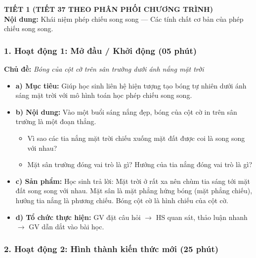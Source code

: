 \documentclass[12pt, a4paper]{article}
\begin{document}
{\large \textbf{TIẾT 1 (TIẾT 37 THEO PHÂN PHỐI CHƯƠNG TRÌNH)}}\\[0.3em]
\textbf{Nội dung:} Khái niệm phép chiếu song song --- Các tính chất cơ bản của phép chiếu song song.

\subsubsection*{1. Hoạt động 1: Mở đầu / Khởi động (05 phút)}
\textbf{Chủ đề:} \textit{Bóng của cột cờ trên sân trường dưới ánh nắng mặt trời}
\begin{itemize}
    \item \textbf{a) Mục tiêu:} Giúp học sinh liên hệ hiện tượng tạo bóng tự nhiên dưới ánh sáng mặt trời với mô hình toán học phép chiếu song song.
    \item \textbf{b) Nội dung:} Vào một buổi sáng nắng đẹp, bóng của cột cờ in trên sân trường là một đoạn thẳng.
    \begin{itemize}
        \item Vì sao các tia nắng mặt trời chiếu xuống mặt đất được coi là song song với nhau?
        \item Mặt sân trường đóng vai trò là gì? Hướng của tia nắng đóng vai trò là gì?
    \end{itemize}
    \item \textbf{c) Sản phẩm:} Học sinh trả lời: Mặt trời ở rất xa nên chùm tia sáng tới mặt đất song song với nhau. Mặt sân là mặt phẳng hứng bóng (mặt phẳng chiếu), hướng tia nắng là phương chiếu. Bóng cột cờ là hình chiếu của cột cờ.
    \item \textbf{d) Tổ chức thực hiện:} GV đặt câu hỏi $\to$ HS quan sát, thảo luận nhanh $\to$ GV dẫn dắt vào bài học.
\end{itemize}

\subsubsection*{2. Hoạt động 2: Hình thành kiến thức mới (25 phút)}
\end{document}
